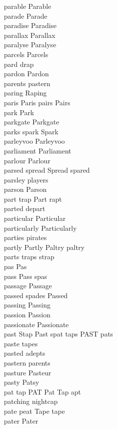 parable Parable\\
parade Parade\\
paradise Paradise\\
parallax Parallax\\
paralyse Paralyse\\
parcels Parcels\\
pard drap\\
pardon Pardon\\
parents pastern\\
paring Raping\\
paris Paris pairs Pairs\\
park Park\\
parkgate Parkgate\\
parks spark Spark\\
parleyvoo Parleyvoo\\
parliament Parliament\\
parlour Parlour\\
parsed spread Spread spared\\
parsley players\\
parson Parson\\
part trap Part rapt\\
parted depart\\
particular Particular\\
particularly Particularly\\
parties pirates\\
partly Partly Paltry paltry\\
parts traps strap\\
pas Pas\\
pass Pass spas\\
passage Passage\\
passed spades Passed\\
passing Passing\\
passion Passion\\
passionate Passionate\\
past Stap Past spat taps PAST pats\\
paste tapes\\
pasted adepts\\
pastern parents\\
pasture Pasteur\\
pasty Patsy\\
pat tap PAT Pat Tap apt\\
patching nightcap\\
pate peat Tape tape\\
pater Pater\\
